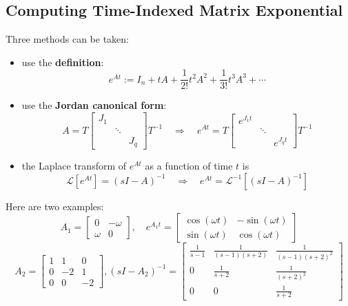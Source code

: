 \documentclass[10pt,a4paper,oneside]{article}
\begin{document}
\subsection{Computing Time-Indexed Matrix Exponential}
Three methods can be taken:
\begin{itemize}
	\item use the \textbf{definition}:
	\[
	e^{A t} :=I_{n}+t A+\frac{1}{2 !} t^{2} A^{2}+\frac{1}{3 !} t^{3} A^{3}+\cdots
	\]
	\item  use the \textbf{Jordan canonical form}:
	\[
	A=T\left[\begin{array}{lll}{J_{1}} & {} & {} \\ {} & {\ddots} & {} \\ {} & {} & {J_{q}}\end{array}\right] T^{-1} \quad \Rightarrow \quad e^{A t}=T\left[\begin{array}{ccc}{e^{J_{1} t}} & {} & {} \\ {} & {\ddots} & {} \\ {} & {} & {e^{J_{q} t}}\end{array}\right] T^{-1}
	\]
	\item the Laplace transform of $e^{At}$ as a function of time $t$ is
	\[
	\mathcal{L}\left[e^{A t}\right]=(sI-A)^{-1} \quad \Rightarrow \quad e^{A t} = \mathcal{L}^{-1}\left[(sI-A)^{-1}\right]
	\]
\end{itemize}
Here are two examples:
\[
A_{1}=\left[\begin{array}{cc}{0} & {-\omega} \\ {\omega} & {0}\end{array}\right], \quad e^{A_{1} t}=\left[\begin{array}{cc}{\cos(\omega t)} & {-\sin(\omega t)} \\ {\sin(\omega t)} & {\cos (\omega t)}\end{array}\right]
\]
\[
A_{2}=\left[\begin{array}{ccc}{1} & {1} & {0} \\ {0} & {-2} & {1} \\ {0} & {0} & {-2}\end{array}\right],\left(sI-A_{2}\right)^{-1}=\left[\begin{array}{ccc}{\frac{1}{s-1}} & {\frac{1}{(s-1)(s+2)}}&{\frac{1}{(s-1)(s+2)^{2}}} \\ {0} & {\frac{1}{s+2}}&  {\frac{1}{(s+2)^2}} \\ {0} & {0}& {\frac{1}{s+2}} \end{array}\right]
\]
\end{document}
